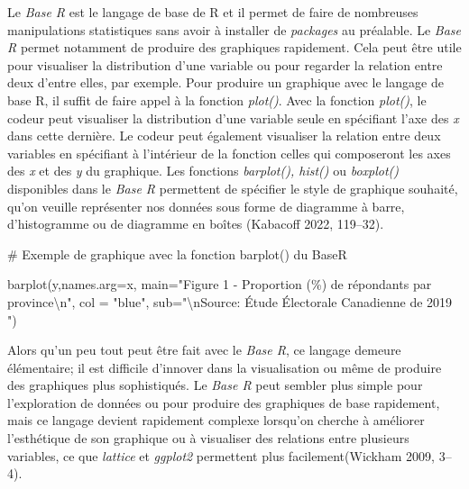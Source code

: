 \documentclass[
  letterpaper,
]{scrbook}
\newenvironment{Shaded}{\begin{snugshade}}{\end{snugshade}}
\newcommand{\AttributeTok}[1]{\textcolor[rgb]{0.40,0.45,0.13}{#1}}
\newcommand{\CommentTok}[1]{\textcolor[rgb]{0.37,0.37,0.37}{#1}}
\newcommand{\FunctionTok}[1]{\textcolor[rgb]{0.28,0.35,0.67}{#1}}
\newcommand{\NormalTok}[1]{\textcolor[rgb]{0.00,0.23,0.31}{#1}}
\newcommand{\SpecialCharTok}[1]{\textcolor[rgb]{0.37,0.37,0.37}{#1}}
\newcommand{\StringTok}[1]{\textcolor[rgb]{0.13,0.47,0.30}{#1}}
\begin{document}
Le \emph{Base R} est le langage de base de R et il permet de faire de
nombreuses manipulations statistiques sans avoir à installer de
\emph{packages} au préalable. Le \emph{Base R} permet notamment de
produire des graphiques rapidement. Cela peut être utile pour visualiser
la distribution d'une variable ou pour regarder la relation entre deux
d'entre elles, par exemple. Pour produire un graphique avec le langage
de base R, il suffit de faire appel à la fonction \emph{plot()}. Avec la
fonction \emph{plot()}, le codeur peut visualiser la distribution d'une
variable seule en spécifiant l'axe des \emph{x} dans cette dernière. Le
codeur peut également visualiser la relation entre deux variables en
spécifiant à l'intérieur de la fonction celles qui composeront les axes
des \emph{x} et des \emph{y} du graphique. Les fonctions
\emph{barplot(), hist()} ou \emph{boxplot()} disponibles dans le
\emph{Base R} permettent de spécifier le style de graphique souhaité,
qu'on veuille représenter nos données sous forme de diagramme à barre,
d'histogramme ou de diagramme en boîtes (Kabacoff 2022, 119--32).

\begin{Shaded}
\begin{Highlighting}[]
\CommentTok{\# Exemple de graphique avec la fonction barplot() du BaseR}

\FunctionTok{barplot}\NormalTok{(y,}\AttributeTok{names.arg=}\NormalTok{x,}
 \AttributeTok{main=}\StringTok{"Figure 1 {-} Proportion (\%) de répondants par province}\SpecialCharTok{\textbackslash{}n}\StringTok{"}\NormalTok{,}
 \AttributeTok{col =} \StringTok{"blue"}\NormalTok{,}
 \AttributeTok{sub=}\StringTok{"}\SpecialCharTok{\textbackslash{}n}\StringTok{Source: Étude Électorale Canadienne de 2019                                                "}\NormalTok{) }
\end{Highlighting}
\end{Shaded}

Alors qu'un peu tout peut être fait avec le \emph{Base R}, ce langage
demeure élémentaire; il est difficile d'innover dans la visualisation ou
même de produire des graphiques plus sophistiqués. Le \emph{Base R} peut
sembler plus simple pour l'exploration de données ou pour produire des
graphiques de base rapidement, mais ce langage devient rapidement
complexe lorsqu'on cherche à améliorer l'esthétique de son graphique ou
à visualiser des relations entre plusieurs variables, ce que
\emph{lattice} et \emph{ggplot2} permettent plus facilement(Wickham
2009, 3--4).
\end{document}
